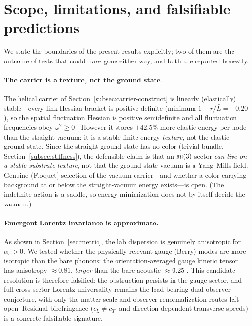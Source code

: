 \section{Scope, limitations, and falsifiable predictions}
\label{sec:limits}

We state the boundaries of the present results explicitly; two of them are the outcome of
tests that could have gone either way, and both are reported honestly.

\paragraph{The carrier is a texture, not the ground state.} The helical carrier
of Section~\ref{subsec:carrier-construct} is linearly (elastically) stable---every link Hessian
bracket is positive-definite (minimum $1-r/\bar L=+0.20$), so the spatial fluctuation Hessian is
positive semidefinite and all fluctuation frequencies obey $\omega^2\ge 0$ \citep{repo}. However
it stores $+42.5\%$ more elastic energy per node than the straight vacuum: it is a stable
finite-energy \emph{texture}, not the elastic ground state. Since the straight ground state has
no color (trivial bundle, Section~\ref{subsec:stiffness}), the defensible claim is that an
$\mathfrak{su}(3)$ sector \emph{can live on a stable substrate texture}, not that the ground-state vacuum
is a Yang--Mills field. Genuine (Floquet) selection of the vacuum carrier---and whether a
color-carrying background at or below the straight-vacuum energy exists---is open. (The
indefinite action is a saddle, so energy minimization does not by itself decide the vacuum.)

\paragraph{Emergent Lorentz invariance is approximate.} As shown in Section~\ref{sec:metric},
the lab dispersion is genuinely anisotropic for $\alpha_s>0$. We tested whether the physically
relevant gauge (Berry) modes are more isotropic than the bare phonons: the orientation-averaged
gauge kinetic tensor has anisotropy $\approx 0.81$, \emph{larger} than the bare acoustic
$\approx 0.25$ \citep{repo}. This candidate resolution is therefore falsified; the obstruction
persists in the gauge sector, and full cross-sector Lorentz universality remains the load-bearing
dual-observer conjecture, with only the matter-scale and observer-renormalization routes left
open. Residual birefringence ($c_L\neq c_T$, and direction-dependent transverse speeds) is a
concrete falsifiable signature.

